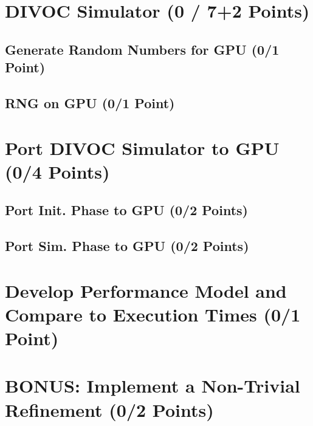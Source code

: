 \section{DIVOC Simulator (0 / 7+2 Points)}
\subsection{Generate Random Numbers for GPU (0/1 Point)}

\subsection{RNG on GPU (0/1 Point)}

\section{Port DIVOC Simulator to GPU (0/4 Points)}
\subsection{Port Init. Phase to GPU (0/2 Points)}

\subsection{Port Sim. Phase to GPU (0/2 Points)}

\section{Develop Performance Model and Compare to Execution Times (0/1 Point)}

\section{BONUS: Implement a Non-Trivial Refinement (0/2 Points)}